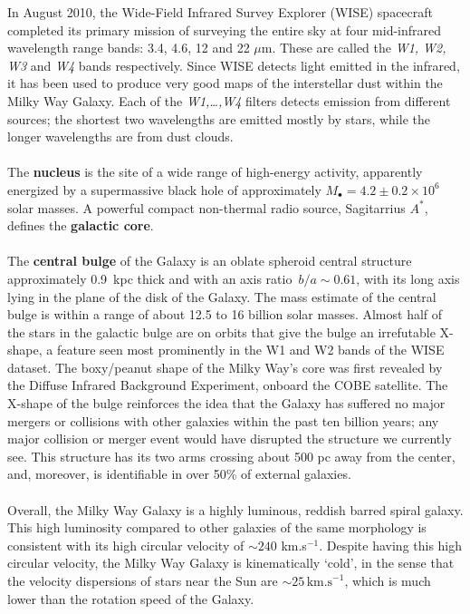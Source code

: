 \documentclass[]{letter}
\begin{document}
\begin{letter}
	
In August 2010, the Wide-Field Infrared Survey Explorer (WISE) spacecraft completed its primary mission of surveying the entire sky at four mid-infrared wavelength range bands: 3.4, 4.6, 12 and 22 $\mu$m. These are called the \emph{W1, W2, W3} and \emph{W4} bands respectively. Since WISE detects light emitted in the infrared, it has been used to produce very good maps of the interstellar dust within the Milky Way Galaxy. Each of the \textit{W1,\dots,W4} filters detects emission from different sources; the shortest two wavelengths are emitted mostly by stars, while the longer wavelengths are from dust clouds.
\\
\\
The \textbf{nucleus} is the site of a wide range of high-energy activity, apparently energized by a supermassive black hole of approximately $M_\bullet= 4.2\pm0.2\times 10^6$ solar masses. A powerful compact non-thermal radio source, Sagitarrius $A^*$, defines the \textbf{galactic core}.
\\
\\
The \textbf{central bulge} of the Galaxy is an oblate spheroid central structure approximately 0.9~kpc thick and with an axis ratio~$b/a \sim0.61$, with its long axis lying in the plane of the disk of the Galaxy. The mass estimate of the central bulge is within a range of about 12.5 to 16 billion solar masses. Almost half of the stars in the galactic bulge are on orbits that give the bulge an irrefutable X-shape, a feature seen most prominently in the W1 and W2 bands of the WISE dataset. The boxy/peanut shape of the Milky Way's core was first revealed by the Diffuse Infrared Background Experiment, onboard the COBE satellite.
The X-shape of the bulge reinforces the idea that the Galaxy has suffered no major mergers or collisions with other galaxies within the past ten billion years; any major collision or merger event would have disrupted the structure we currently see.	
This structure has its two arms crossing about 500 pc away from the center, and, moreover, is identifiable in over 50\% of external galaxies.
\\
\\
Overall, the Milky Way Galaxy is a highly luminous, reddish barred spiral galaxy. This high luminosity compared to other galaxies of the same morphology is consistent with its high circular velocity of $\sim240$ km.s$^{-1}$. Despite having this high circular velocity, the Milky Way Galaxy is kinematically `cold', in the sense that the velocity dispersions of stars near the Sun are $\sim 25\,\text{km.s}^{-1}$, which is much lower than the rotation speed of the Galaxy.


\end{letter}
\end{document}
